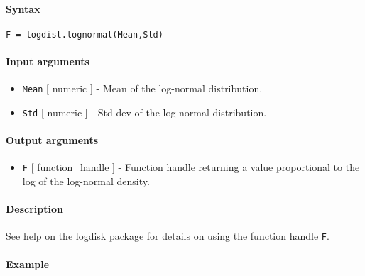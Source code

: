 


	\paragraph{Syntax}\label{syntax}

\begin{verbatim}
F = logdist.lognormal(Mean,Std)
\end{verbatim}

\paragraph{Input arguments}\label{input-arguments}

\begin{itemize}
\item
  \texttt{Mean} {[} numeric {]} - Mean of the log-normal distribution.
\item
  \texttt{Std} {[} numeric {]} - Std dev of the log-normal distribution.
\end{itemize}

\paragraph{Output arguments}\label{output-arguments}

\begin{itemize}
\itemsep1pt\parskip0pt
\item
  \texttt{F} {[} function\_handle {]} - Function handle returning a
  value proportional to the log of the log-normal density.
\end{itemize}

\paragraph{Description}\label{description}

See \href{logdist/Contents}{help on the logdisk package} for details on
using the function handle \texttt{F}.

\paragraph{Example}\label{example}


